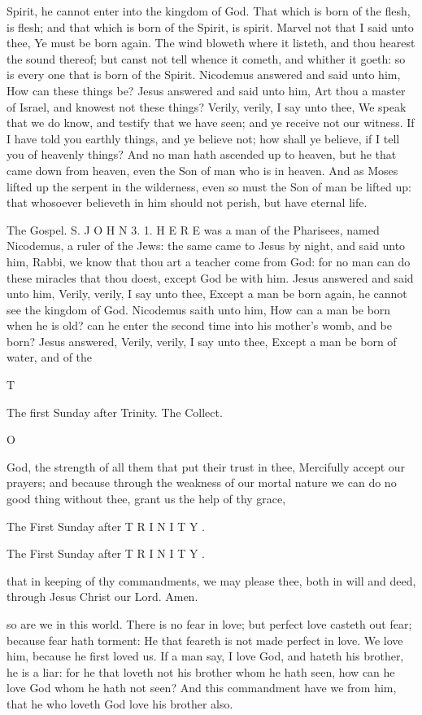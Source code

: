 Spirit, he cannot enter into the kingdom of God. That which is born of the flesh, is flesh; and that which is born of the Spirit, is spirit. Marvel not that I said unto thee, Ye must be born again. The wind bloweth where it listeth, and thou hearest the sound thereof; but canst not tell whence it cometh, and whither it goeth: so is every one that is born of the Spirit. Nicodemus answered and said unto him, How can these things be? Jesus answered and said unto him, Art thou a master of Israel, and knowest not these things? Verily, verily, I say unto thee, We speak that we do know, and testify that we have seen; and ye receive not our witness. If I have told you earthly things, and ye believe not; how shall ye believe, if I tell you of heavenly things? And no man hath ascended up to heaven, but he that came down from heaven, even the Son of man who is in heaven. And as Moses lifted up the serpent in the wilderness, even so must the Son of man be lifted up: that whosoever believeth in him should not perish, but have eternal life.

The Gospel. S. J O H N 3. 1. H E R E was a man of the Pharisees, named Nicodemus, a ruler of the Jews: the same came to Jesus by night, and said unto him, Rabbi, we know that thou art a teacher come from God: for no man can do these miracles that thou doest, except God be with him. Jesus answered and said unto him, Verily, verily, I say unto thee, Except a man be born again, he cannot see the kingdom of God. Nicodemus saith unto him, How can a man be born when he is old? can he enter the second time into his mother's womb, and be born? Jesus answered, Verily, verily, I say unto thee, Except a man be born of water, and of the

T

The first Sunday after Trinity. The Collect.

O

God, the strength of all them that put their trust in thee, Mercifully accept our prayers; and because through the weakness of our mortal nature we can do no good thing without thee, grant us the help of thy grace,

The First Sunday after T R I N I T Y .

The First Sunday after T R I N I T Y .

that in keeping of thy commandments, we may please thee, both in will and deed, through Jesus Christ our Lord. Amen.

so are we in this world. There is no fear in love; but perfect love casteth out fear; because fear hath torment: He that feareth is not made perfect in love. We love him, because he first loved us. If a man say, I love God, and hateth his brother, he is a liar: for he that loveth not his brother whom he hath seen, how can he love God whom he hath not seen? And this commandment have we from him, that he who loveth God love his brother also.

